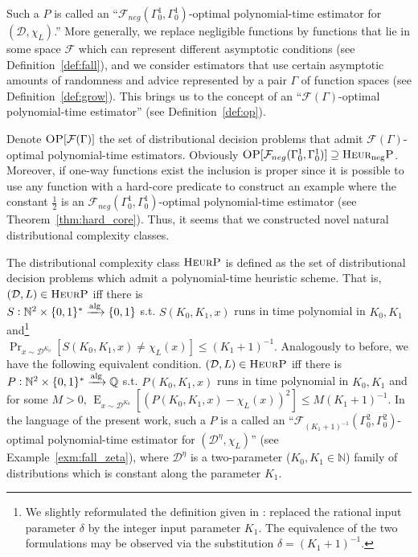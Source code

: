 \documentclass[11pt]{article}
\numberwithin{equation}{section}
\theoremstyle{definition}
\theoremstyle{plain}
\newcommand{\Bool}{\{0,1\}}
\newcommand{\Words}{{\Bool^*}}
\DeclareMathOperator{\Prb}{Pr}
\DeclareMathOperator{\E}{E}
\newcommand{\Nats}{\mathbb{N}}
\newcommand{\Rats}{\mathbb{Q}}
\newcommand{\Dist}{\mathcal{D}}
\newcommand{\Fall}{\mathcal{F}}
\newcommand{\EG}{\Fall(\Gamma)}
\newcommand{\Alg}{\xrightarrow{\textnormal{alg}}}
\begin{document}
Such a ${P}$ is called an \enquote{${\Fall_{neg}(\Gamma_0^1,\Gamma_0^1)}$-optimal polynomial-time estimator for ${(\Dist,\chi_L)}$.} More generally, we replace negligible functions by functions that lie in some space ${\Fall}$ which can represent different asymptotic conditions (see Definition~\ref{def:fall}), and we consider estimators that use certain asymptotic amounts of randomness and advice represented by a pair ${\Gamma}$ of function spaces (see Definition~\ref{def:grow}). This brings us to the concept of an \enquote{${\EG}$-optimal polynomial-time estimator} (see Definition~\ref{def:op}).

Denote ${\textsc{OP}[{\EG}]}$ the set of distributional decision problems that admit ${\EG}$-optimal polynomial-time estimators. Obviously ${\textsc{OP}[\Fall_{neg}(\Gamma_0^1,\Gamma_0^1)] \supseteq \textsc{Heur}_\text{neg}\textsc{P}}$. Moreover, if one-way functions exist the inclusion is proper since it is possible to use any function with a hard-core predicate to construct an example where the constant ${\frac{1}{2}}$ is an ${\Fall_{neg}(\Gamma_0^1,\Gamma_0^1)}$-optimal polynomial-time estimator (see Theorem~\ref{thm:hard_core}). Thus, it seems that we constructed novel natural distributional complexity classes.

The distributional complexity class ${\textsc{HeurP}}$ is defined as the set of distributional decision problems which admit a polynomial-time heuristic scheme\cite{Bogdanov_2006}. That is, ${(\Dist,L) \in \textsc{HeurP}}$ iff there is\\ ${S: \Nats^2 \times \Words \Alg \Bool}$ s.t. ${S(K_0,K_1,x)}$ runs in time polynomial in ${K_0, K_1}$ and\footnote{We slightly reformulated the definition given in \cite{Bogdanov_2006}: replaced the rational input parameter ${\delta}$ by the integer input parameter ${K_1}$. The equivalence of the two formulations may be observed via the substitution ${\delta=(K_1+1)^{-1}}$.}\\ ${\Prb_{x \sim \Dist^{K_0}}[S(K_0,K_1,x) \ne \chi_L(x)] \leq (K_1+1)^{-1}}$. Analogously to before, we have the following equivalent condition. ${(\Dist,L) \in \textsc{HeurP}}$ iff there is ${P: \Nats^2 \times \Words \Alg \Rats}$ s.t. ${P(K_0,K_1,x)}$ runs in time polynomial in ${K_0,K_1}$ and for some ${M > 0}$, ${\E_{x \sim \Dist^{K_0}}[(P(K_0,K_1,x)-\chi_L(x))^2] \leq M (K_1+1)^{-1}}$. In the language of the present work, such a ${P}$ is a called an \enquote{${\Fall_{(K_1+1)^{-1}}(\Gamma_0^2, \Gamma_0^2)}$-optimal polynomial-time estimator for ${(\Dist^\eta,\chi_L)}$} (see Example~\ref{exm:fall_zeta}), where ${\Dist^\eta}$ is a two-parameter (${K_0,K_1 \in \Nats}$) family of distributions which is constant along the parameter ${K_1}$.
\end{document}
